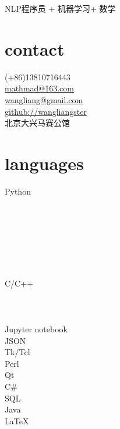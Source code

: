\documentclass[letterpaper,10pt]{Resume_Liang}
\begin{document}
\thispagestyle{empty}
 {NLP程序员 + 机器学习+ 数学}
\begin{aside}
  \section{contact}
    (+86)13810716443\\
    \href{mailto:mathmad@163.com}{mathmad@163.com}\\
    \href{mailto:wangliangster@gmail.com}{wangliang@gmail.com}\\
    \href{https://github.com/wangliangster}{github://wangliangster}\\
    北京大兴马赛公馆\\
   \vspace{\baselineskip}
  \section{languages}
    Python\\
    \\
    \\
    \\
    \\
    \\
    \\
    \\
    C/C++\\
    \\
    \\
    \\
    Jupyter notebook\\
    JSON\\
    Tk/Tcl\\
    Perl\\
    Qt\\
    C\#\\
    SQL\\
    Java\\
    \LaTeX \\
   \vspace{\baselineskip}

\end{aside}
\end{document}

